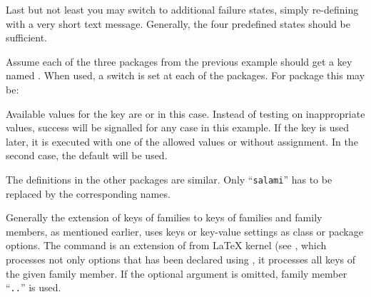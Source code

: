 Last but not least you may switch to additional failure states, simply
re-defining  with a very short text message.
Generally, the four predefined states should be sufficient.

\begin{Example}
  Assume each of the three packages from the previous example should get a
  key named . When used, a switch is set at each of
  the packages. For package  this may be:
  Available values for the key are  or  in this
  case. Instead of testing on inappropriate values, success will be signalled
  for any case in this example. If the key is used later, it is executed with
  one of the allowed values or without assignment. In the second case, the
  default  will be used.

  The definitions in the other packages are similar. Only ``\texttt{salami}''
  has to be replaced by the corresponding names.
\end{Example}
%
%
%
%
%
%
%


\begin{Declaration}
\end{Declaration}
%
Generally the extension of keys of families to keys of families and family
members, as mentioned earlier, uses keys or key-value settings as class or
package options. The command  is an extension of
 from \LaTeX{} kernel (see \cite{latex:clsguide}, which
processes not only options that has been declared using ,
it processes all keys of the given family member. If the optional argument
 is omitted, family member
``\texttt{.}\texttt{.}'' is used.

